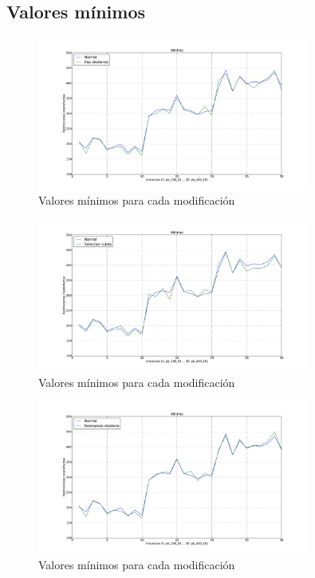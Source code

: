 \newpage

\subsection{Valores mínimos}

\begin{figure}[H]
\begin{center}
\includegraphics[width=0.8\textwidth]{img/min-1.pdf}
\end{center}
\caption{Valores mínimos para cada modificación}
\label{fig:min-1}
\end{figure}

\begin{figure}[H]
\begin{center}
\includegraphics[width=0.8\textwidth]{img/min-2.pdf}
\end{center}
\caption{Valores mínimos para cada modificación}
\label{fig:min-2}
\end{figure}

\begin{figure}[H]
\begin{center}
\includegraphics[width=0.8\textwidth]{img/min-3.pdf}
\end{center}
\caption{Valores mínimos para cada modificación}
\label{fig:min-3}
\end{figure}

